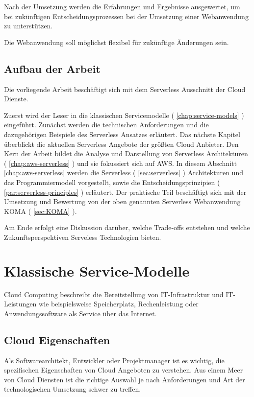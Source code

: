 \documentclass[
12pt,
english,
ngerman,
headsepline,
twoside,
openright,
numbers=noenddot,version=first
]{scrreprt}
\begin{document}
Nach der Umsetzung werden die Erfahrungen und Ergebnisse ausgewertet, um bei zukünftigen Entscheidungsprozessen bei der Umsetzung einer Webanwendung zu unterstützen.

Die Webanwendung soll möglichst flexibel für zukünftige Änderungen sein.

\section{Aufbau der Arbeit}
\label{sec:layout}

Die vorliegende Arbeit beschäftigt sich mit dem Serverless Ausschnitt der Cloud Dienste. 

Zuerst wird der Leser in die klassischen Servicemodelle ( \autoref{chap:service-models} ) eingeführt. Zunächst werden die technischen Anforderungen und die dazugehörigen Beispiele des Serverless Ansatzes erläutert.
Das nächste Kapitel überblickt die aktuellen Serverless Angebote der größten Cloud Anbieter.
Den Kern der Arbeit bildet die Analyse und Darstellung von Serverless Architekturen ( \autoref{chap:aws-serverless} ) und sie fokussiert sich auf \acrfull{AWS}. In diesem Abschnitt  \autoref{chap:aws-serverless} werden die Serverless ( \autoref{sec:serverless} ) Architekturen und das Programmiermodell vorgestellt, sowie die Entscheidungsprinzipien ( \autoref{par:serverless-principles} ) erläutert.
Der praktische Teil beschäftigt sich mit der Umsetzung und Bewertung von der oben genannten Serverless Webanwendung KOMA ( \autoref{sec:KOMA} ).

Am Ende erfolgt eine Diskussion darüber, welche Trade-offs entstehen und welche Zukunftsperspektiven Serveless Technologien bieten.


\chapter{Klassische Service-Modelle}
\label{chap:service-models}
\label{chap:principles}
Cloud Computing beschreibt die Bereitstellung von IT-Infrastruktur und IT-Leistungen wie beispielsweise Speicherplatz, Rechenleistung oder Anwendungssoftware als Service über das Internet.\cite{cloudEssentials}

\section{Cloud Eigenschaften}
\label{sec:cloud-char}
Als Softwarearchitekt, Entwickler oder Projektmanager ist es wichtig, die spezifischen Eigenschaften von Cloud Angeboten zu verstehen. Aus einem Meer von Cloud Diensten ist die richtige Auswahl je nach Anforderungen und Art der technologischen Umsetzung schwer zu treffen. 
\end{document}
